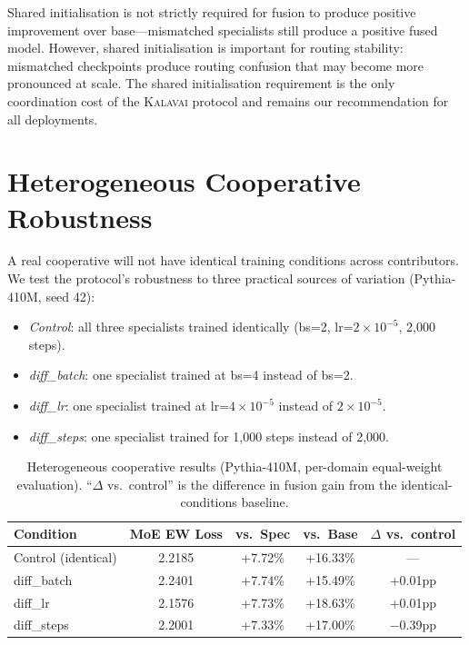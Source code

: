 \documentclass{article}
\newcommand{\kalavai}{\textsc{Kalavai}\xspace}
\begin{document}
Shared initialisation is not strictly required for fusion to produce positive improvement over base---mismatched specialists still produce a positive fused model. However, shared initialisation is important for routing stability: mismatched checkpoints produce routing confusion that may become more pronounced at scale. The shared initialisation requirement is the only coordination cost of the \kalavai protocol and remains our recommendation for all deployments.

\section{Heterogeneous Cooperative Robustness}
\label{app:heterogeneous}

A real cooperative will not have identical training conditions across contributors. We test the protocol's robustness to three practical sources of variation (Pythia-410M, seed 42):

\begin{itemize}[leftmargin=*, itemsep=1pt]
  \item \emph{Control}: all three specialists trained identically (bs=2, lr=$2\times10^{-5}$, 2,000 steps).
  \item \emph{diff\_batch}: one specialist trained at bs=4 instead of bs=2.
  \item \emph{diff\_lr}: one specialist trained at lr=$4\times10^{-5}$ instead of $2\times10^{-5}$.
  \item \emph{diff\_steps}: one specialist trained for 1,000 steps instead of 2,000.
\end{itemize}

\begin{table}[h]
\centering
\caption{Heterogeneous cooperative results (Pythia-410M, per-domain equal-weight evaluation). ``$\Delta$ vs.\ control'' is the difference in fusion gain from the identical-conditions baseline.}
\label{tab:heterogeneous}
\small
\begin{tabular}{lcccc}
\toprule
\textbf{Condition} & \textbf{MoE EW Loss} & \textbf{vs.\ Spec} & \textbf{vs.\ Base} & \textbf{$\Delta$ vs.\ control} \\
\midrule
Control (identical)  & 2.2185 & +7.72\% & +16.33\% & --- \\
diff\_batch          & 2.2401 & +7.74\% & +15.49\% & +0.01pp \\
diff\_lr             & 2.1576 & +7.73\% & +18.63\% & +0.01pp \\
diff\_steps          & 2.2001 & +7.33\% & +17.00\% & $-$0.39pp \\
\bottomrule
\end{tabular}
\end{table}
\end{document}
